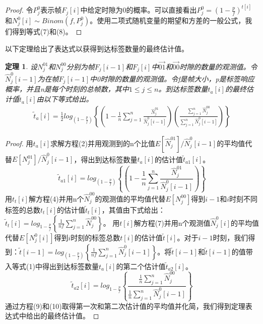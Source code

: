 \documentclass[UTF8]{ctexart}
\newtheorem{theorem}{定理}
\newtheorem*{proof}{证明}
\begin{document}
\begin{proof}
令$P^0_j$表示帧$F_j[i]$中给定时隙为0的概率。可以直接看出$P^0_j=\left(1-\frac{p}{f}\right)^{t[i]}$和$N^0_j[i]\sim Binom\left(f,P^0_j\right)$。使用二项式随机变量的期望和方差的一般公式，我们得到等式(7)和(8)。
\end{proof}

以下定理给出了表达式以获得到达标签数量的最终估计值。

\begin{theorem}
设$N^{01}_j$和$N^{00}_j$分别为帧$F_j[i-1]$和$F_j[i]$中$\overrightarrow{01}$和$\overrightarrow{00}$时隙的数量的观测值。令$\hat{N}^0_j[i-1]$为在帧$F_j[i-1]$中0时隙的数量的观测值。令f是帧大小，p是标签响应概率，并且n是每个时刻的总帧数，其中$1\leq j\leq n$。到达标签数量$t_a[i]$的最终估计值$\widetilde{t}_a[i]$由以下等式给出。
\begin{eqnarray*}
\widetilde{t}_a[i]=\frac{1}{2}log_{\left(1-\frac{p}{f}\right)}\left\{\left(1-\frac{1}{n}\sum_{j=1}^{n}\frac{\hat{N}^{01}_j}{\hat{N}^0_j\left[i-1\right]}\right)\left(\frac{\sum_{j=1}^{n}\hat{N}^{00}_j}{\sum_{j=1}^{n}\hat{N}^0_j\left[i-1\right]}\right)\right\}
\end{eqnarray*}
\end{theorem}

\begin{proof}
用$t_a[i]$求解方程(2)并用观测到的n个比值$E[\hat{N}^{01}_j]/\hat{N}^0_j[i-1]$的平均值代替$E[N^{01}_j]/\hat{N}^0_j[i-1]$，得出到达标签数量$t_a[i]$的估计值$\widetilde{t}_{a1}[i]$。
\begin{equation}
\widetilde{t}_{a1}[i]=log_{\left(1-\frac{p}{f}\right)}\left\{\left(1-\frac{1}{n}\sum_{j=1}^{n}\frac{\hat{N}^{01}_j}{\hat{N}^0_j\left[i-1\right]}\right)\right\}
\end{equation}
用$t_t[i]$解方程(4)并用n个$\hat{N}^{00}_j$的观测值的平均值代替$E[N^{00}_j]$得到$i-1$和$i$时刻不同标签的总数$t_t[i]$的估计值$\widetilde{t}_t[i]$，其值由下式给出：\\$\widetilde{t}_t[i]=log_{1-\frac{p}{f}}\left\{\frac{1}{nf}\sum_{j=1}^{n}\hat{N}^{00}_j\right\}$。 用$t[i]$解方程(7)并用n个观测值$\hat{N}^0_j[i]$的平均值代替$E[N^0_j[i]]$得到$i$时刻的标签总数$t[i]$的估计值$\widetilde{t}[i]$。对于$i-1$时刻，我们得到：$\widetilde{t}[i-1]=log_{(1-\frac{p}{f})}\left\{\frac{1}{nf}\sum_{j=1}^{n}\hat{N}^0_j\left[i-1\right]\right\}$。将$\widetilde{t}[i-1]$和$\widetilde{t}[i-1]$的值带入等式(1)中得出到达标签数量$t_a[i]$的第二个估计值$\widetilde{t}_{a2}[i]$。
\begin{equation}
\widetilde{t}_{a2}[i]=log_{1-\frac{p}{f}}\left\{\frac{\frac{1}{n}\sum_{j=1}^{n}\hat{N}^{00}_j}{\frac{1}{n}\sum_{j=1}^{n}\hat{N}^0_j[i-1]}\right\}
\end{equation}
通过方程(9)和(10)取得第一次和第二次估计值的平均值并化简，我们得到定理表达式中给出的最终估计值。
\end{proof}
\end{document}
